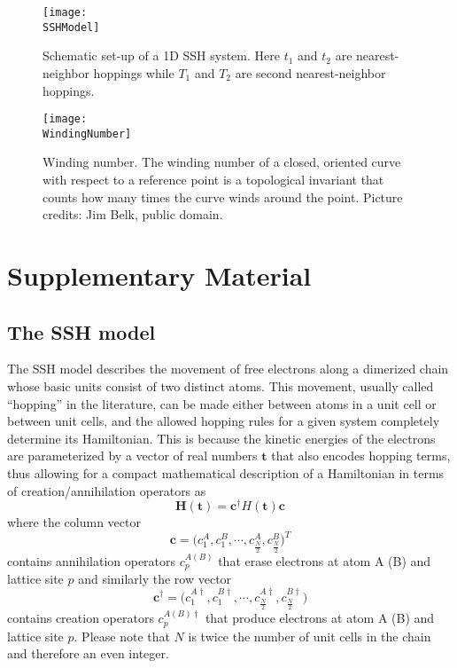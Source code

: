 \documentclass[10pt]{revtex4-1}
\newcommand\SSHModel{./supp_ssh_model.pdf}
\newcommand\WindingNumber{./supp_winding.png}
\begin{document}

\begin{figure}
  \centering
  \texttt{[image: \\SSHModel]}
  \caption{Schematic set-up of a 1D SSH system. Here $t_1$ and $t_2$ are nearest-neighbor hoppings while $T_1$ and $T_2$ are second nearest-neighbor hoppings.}
\label{fig:model}
\end{figure}

\begin{figure}%
  \centering
  \texttt{[image: \\WindingNumber]}
  \caption{Winding number. The winding number of a closed, oriented curve with respect to a reference point is a topological invariant that counts how many times the curve winds around the point. Picture credits: Jim Belk, public domain.}
\label{fig:winding}
\end{figure}

\section*{Supplementary Material}
\subsection*{The SSH model}
\label{sshapp}

The SSH model \cite{asboth2016short} describes the movement of free electrons along a dimerized chain whose basic units consist of two distinct atoms. This movement, usually called ``hopping'' in the literature, can be made either between atoms in a unit cell or between unit cells, and the allowed hopping rules for a given system completely determine its Hamiltonian. This is because the kinetic energies of the electrons are parameterized by a vector of real numbers $\mathbf{t}$ that also encodes hopping terms, thus allowing for a compact mathematical description of a Hamiltonian in terms of creation/annihilation operators as
\begin{equation}
\label{SSH}
\mathbf{H}(\mathbf{t})=\mathbf{c}^{\dagger}H(\mathbf{t})\mathbf{c}
\end{equation}
where the column vector
\begin{equation*}
\mathbf{c} =\Big(c^{A}_1,c^{B}_1,\cdots,c^{A}_\frac{N}{2},c^{B}_\frac{N}{2}\Big)^T
\end{equation*}
contains annihilation operators $c^{A(B)}_p$ that erase electrons at atom A (B) and lattice site $p$ and similarly the row vector
\begin{equation*}
\mathbf{c}^\dagger =\Big(c^{A\dagger}_1,c^{B\dagger}_1,\cdots,c^{A\dagger}_\frac{N}{2},c^{B\dagger}_\frac{N}{2}\Big)
\end{equation*}
contains creation operators $c^{A(B)\dagger}_p$ that produce electrons at atom A (B) and lattice site $p$. Please note that $N$ is twice the number of unit cells in the chain and therefore an even integer.
\end{document}

